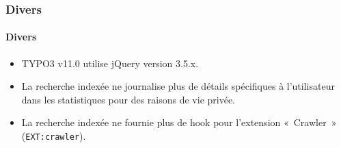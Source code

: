 %

\begin{frame}[fragile]
	\frametitle{Divers}
	\framesubtitle{Divers}

	\begin{itemize}
		\item TYPO3 v11.0 utilise jQuery version 3.5.x.
		\item La recherche indexée ne journalise plus de détails spécifiques à l'utilisateur
			dans les statistiques pour des raisons de vie privée.
		\item La recherche indexée ne fournie plus de hook pour l'extension «~Crawler~»
			(\small\texttt{EXT:crawler}\normalsize).
	\end{itemize}

\end{frame}

